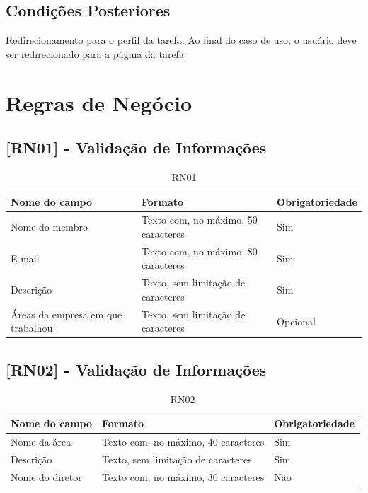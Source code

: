 \begin{apendicesenv}
\subsection{Condições Posteriores}

Redirecionamento para o perfil da tarefa. Ao final do caso de uso, o usuário deve ser redirecionado para a página da tarefa



\section{Regras de Negócio}

\subsection{[RN01] - Validação de Informações}

\begin{table}[!h]
\centering
\caption{RN01}
\label{RN01}
\begin{tabular}{|p{4cm}|p{8cm}|p{3cm}|}
\hline
Nome do campo                     & Formato                             & Obrigatoriedade \\ \hline
Nome do membro                    & Texto com, no máximo, 50 caracteres & Sim             \\ \hline
E-mail                            & Texto com, no máximo, 80 caracteres & Sim             \\ \hline
Descrição                         & Texto, sem limitação de caracteres  & Sim             \\ \hline
Áreas da empresa em que trabalhou & Texto, sem limitação de caracteres  & Opcional        \\ \hline
\end{tabular}
\end{table}

\clearpage{}


\subsection{[RN02] - Validação de Informações}

\begin{table}[!h]
\centering
\caption{RN02}
\label{RN02}
\begin{tabular}{|p{4cm}|p{8cm}|p{3cm}|}
\hline
Nome do campo   & Formato                             & Obrigatoriedade \\ \hline
Nome da área    & Texto com, no máximo, 40 caracteres & Sim             \\ \hline
Descrição       & Texto, sem limitação de caracteres  & Sim             \\ \hline
Nome do diretor & Texto com, no máximo, 30 caracteres & Não             \\ \hline
\end{tabular}
\end{table}



\end{apendicesenv}
